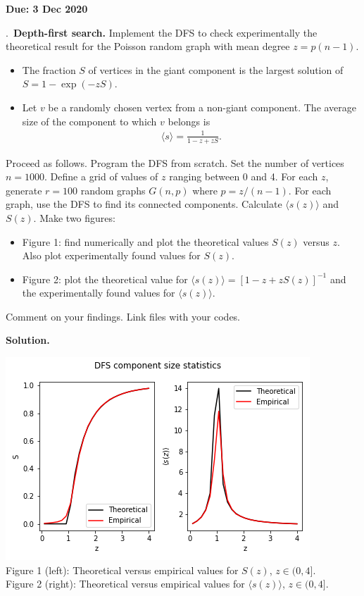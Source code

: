 \documentclass{letter}
\newcounter{problem}
\newcounter{solution}
\newcommand{\Problem}[2]{%
	\stepcounter{problem}%
	\leftskip=0pt%
	\theproblem.~\textbf{{#1.}} #2 \par%
}
\newcommand{\Solution}[1]{%
	\textbf{Solution.} #1 \par%
}
\newcommand{\Due}[1]{\textbf{Due: #1} \par}
\begin{document}
    \Due{3 Dec 2020}

    \Problem{Depth-first search}{Implement the DFS to check experimentally the theoretical result for the Poisson random graph with mean degree $z = p(n-1)$. \begin{itemize}
        \item The fraction $S$ of vertices in the giant component is the largest solution of $S = 1 - \exp(-zS)$.
        \item Let $v$ be a randomly chosen vertex from a non-giant component. The average size of the component to which $v$ belongs is \begin{align*}
            \langle s \rangle = \frac{1}{1- z + zS}.
    \end{align*}
    \end{itemize} Proceed as follows. Program the DFS from scratch. Set the number of vertices $n = 1000$. Define a grid of values of $z$ ranging between 0 and 4. For each $z$, generate $r = 100$ random graphs $G(n,p)$ where $p = z/(n-1)$. For each graph, use the DFS to find its connected components. Calculate $\langle s(z) \rangle$ and $S(z)$. Make two figures: \begin{itemize}
        \item Figure 1: find numerically and plot the theoretical values $S(z)$ versus $z$. Also plot experimentally found values for $S(z)$.
        \item Figure 2: plot the theoretical value for $\langle s(z) \rangle = [1 - z + zS(z)]^{-1}$ and the experimentally found values for $\langle s(z) \rangle$.
    \end{itemize} Comment on your findings. Link files with your codes.}
    \Solution{

    \begin{center} 
        \includegraphics{../code/dfsstats.png} \\
        Figure 1 (left): Theoretical versus empirical values for $S(z)$, $z \in (0, 4]$. \\
        Figure 2 (right): Theoretical versus empirical values for $\langle s(z) \rangle$, $z \in (0, 4]$.
    \end{center}}
\end{document}
